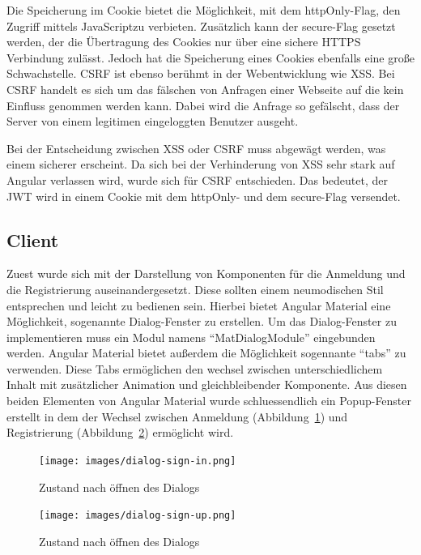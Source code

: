 \documentclass[paper=a4,fontsize=12pt,parskip=half]{scrartcl}
\newcommand{\JS}{JavaScript}
\begin{document}
\begin{description}
		Die Speicherung im Cookie bietet die Möglichkeit, mit dem httpOnly-Flag, den Zugriff mittels \JS zu verbieten. Zusätzlich kann der secure-Flag gesetzt werden, der die Übertragung des Cookies nur über eine sichere \gls{HTTPS} Verbindung zulässt. Jedoch hat die Speicherung eines Cookies ebenfalls eine große Schwachstelle. \gls{CSRF} ist ebenso berühmt in der Webentwicklung wie \gls{XSS}. Bei \gls{CSRF} handelt es sich um das fälschen von Anfragen einer Webseite auf die kein Einfluss genommen werden kann. Dabei wird die Anfrage so gefälscht, dass der Server von einem legitimen eingeloggten Benutzer ausgeht.
		
		Bei der Entscheidung zwischen \gls{XSS} oder \gls{CSRF} muss abgewägt werden, was einem sicherer erscheint. Da sich bei der Verhinderung von \gls{XSS} sehr stark auf Angular verlassen wird, wurde sich für \gls{CSRF} entschieden. Das bedeutet, der \gls{JWT} wird in einem Cookie mit dem httpOnly- und dem secure-Flag versendet.
	\end{description}

	\subsection{Client}
	\label{sec: client}
	Zuest wurde sich mit der Darstellung von Komponenten für die Anmeldung und die Registrierung auseinandergesetzt. Diese sollten einem neumodischen Stil entsprechen und leicht zu bedienen sein. Hierbei bietet Angular Material eine Möglichkeit, sogenannte Dialog-Fenster zu erstellen. Um das Dialog-Fenster zu implementieren muss ein Modul namens \enquote{MatDialogModule} eingebunden werden. Angular Material bietet außerdem die Möglichkeit sogennante \enquote{tabs} zu verwenden. Diese Tabs ermöglichen den wechsel zwischen unterschiedlichem Inhalt mit zusätzlicher Animation und gleichbleibender Komponente. Aus diesen beiden Elementen von Angular Material wurde schluessendlich ein Popup-Fenster erstellt in dem der Wechsel zwischen Anmeldung (Abbildung~\ref{fig:dialog_sign_in}) und Registrierung (Abbildung~\ref{fig:dialog_sign_up}) ermöglicht wird. 
	
	\begin{figure}
		\texttt{[image: images/dialog-sign-in.png]}
		\caption{Zustand nach öffnen des Dialogs}
		\label{fig:dialog_sign_in}
	\end{figure}

	\begin{figure}
		\texttt{[image: images/dialog-sign-up.png]}
		\caption{Zustand nach öffnen des Dialogs}
		\label{fig:dialog_sign_up}
	\end{figure}
	
\end{document}
